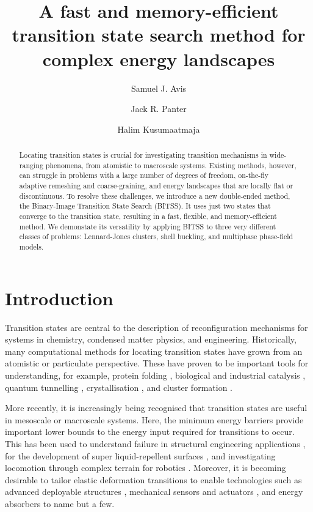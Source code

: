 \documentclass[twocolumn,10pt]{revtex4}
\begin{document}
\title{A fast and memory-efficient transition state search method for complex energy landscapes}
\author{Samuel J. Avis}
\author{Jack R. Panter}
\author{Halim Kusumaatmaja}

\begin{abstract}
  Locating transition states is crucial for investigating transition mechanisms in wide-ranging phenomena, from atomistic to macroscale systems.
  Existing methods, however, can struggle in problems with a large number of degrees of freedom, on-the-fly adaptive remeshing and coarse-graining, and energy landscapes that are locally flat or discontinuous.
  To resolve these challenges, we introduce a new double-ended method, the Binary-Image Transition State Search (BITSS).
  It uses just two states that converge to the transition state, resulting in a fast, flexible, and memory-efficient method.
  We demonstate its versatility by applying BITSS to three very different classes of problems: Lennard-Jones clusters, shell buckling, and multiphase phase-field models.
\end{abstract}

\maketitle


\section{Introduction}
Transition states are central to the description of reconfiguration mechanisms for systems in chemistry, condensed matter physics, and engineering.
Historically, many computational methods for locating transition states have grown from an atomistic or particulate perspective.
These have proven to be important tools for understanding, for example, protein folding \cite{Bryngelson1995,Onuchic1997}, biological and industrial catalysis \cite{Boehr2006,Kerns2015,Guo2018a}, quantum tunnelling \cite{Richardson2016,Vaillant2019}, crystallisation \cite{Richard2018}, and cluster formation \cite{Wales1998,Wales2012}.

More recently, it is increasingly being recognised that transition states are useful in mesoscale or macroscale systems.
Here, the minimum energy barriers provide important lower bounds to the energy input required for transitions to occur.
This has been used to understand failure in structural engineering applications \cite{Panter2019,Hutchinson2018}, for the development of super liquid-repellent surfaces \cite{Zhang2014,Panter2019b,Amabili2017}, and investigating locomotion through complex terrain for robotics \cite{Othayoth2020}.
Moreover, it is becoming desirable to tailor elastic deformation transitions to enable technologies such as advanced deployable structures \cite{Filipov2015,Zhai2018}, mechanical sensors and actuators \cite{Bertoldi2017,Truby2016,Chi2022,Bonfanti2020}, and energy absorbers \cite{Shan2015,Giri2021} to name but a few.
\end{document}
